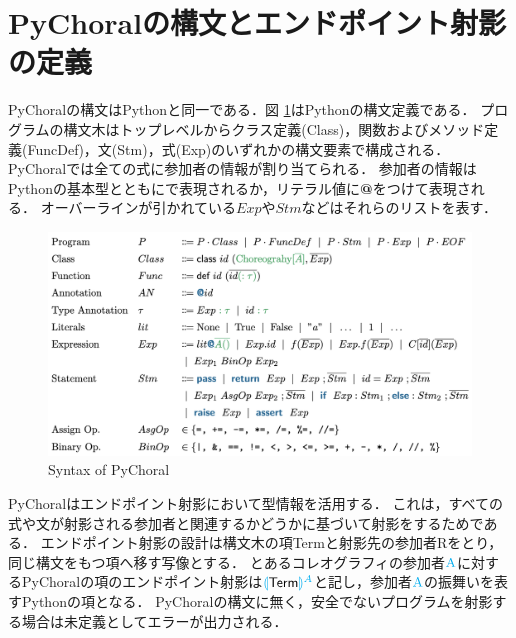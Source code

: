 \documentclass{thesis}
\newcommand{\projection}[2]{{\color{cyan}\llparenthesis}#1{\color{cyan}\rrparenthesis^#2}}
\newcommand{\mblue}[1]{\textbf{\textsf{\color{MidnightBlue}#1}}}
\newcommand{\cyan}[1]{\color{cyan}#1}
\begin{document}
\section{PyChoralの構文とエンドポイント射影の定義}
PyChoralの構文はPythonと同一である．図 \ref{syntax}はPythonの構文定義である．
プログラムの構文木はトップレベルからクラス定義(\textsf{Class})，関数およびメソッド定義(\textsf{FuncDef})，文(\textsf{Stm})，式(\textsf{Exp})のいずれかの構文要素で構成される．
PyChoralでは全ての式に参加者の情報が割り当てられる．
参加者の情報はPythonの基本型とともに{\color{Green}{Typed Annotation}}で表現されるか，リテラル値に\mblue{@}をつけて表現される．
オーバーラインが引かれている$Exp$や$Stm$などはそれらのリストを表す．
\begin{figure}[H]
  \centering
  \includegraphics[scale=0.8]{image/syntax.png}
  \caption{Syntax of PyChoral}
  \label{syntax}
\end{figure}
PyChoralはエンドポイント射影において型情報を活用する．
これは，すべての式や文が射影される参加者と関連するかどうかに基づいて射影をするためである．
エンドポイント射影の設計は構文木の項\textsf{Term}と射影先の参加者\textsf{R}をとり，同じ構文をもつ項へ移す写像とする．
とあるコレオグラフィの参加者$\cyan{\text{A}}$に対するPyChoralの項のエンドポイント射影は$\projection{\textsf{Term}}{A}$と記し，参加者$\cyan{\text{A}}$の振舞いを表すPythonの項となる．
PyChoralの構文に無く，安全でないプログラムを射影する場合は未定義としてエラーが出力される．
%
\end{document}
